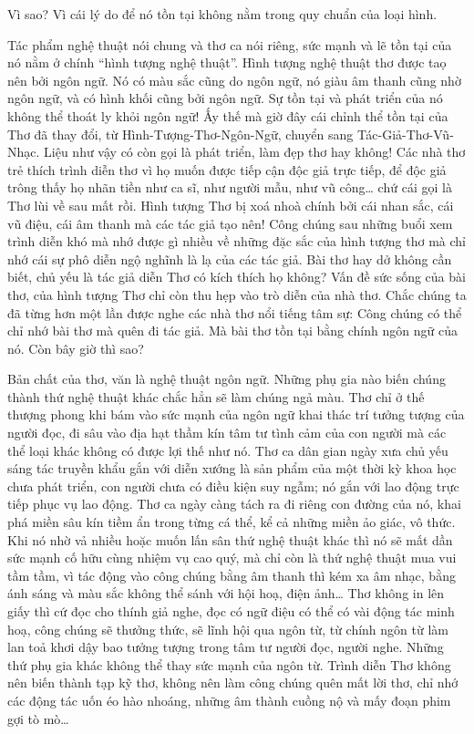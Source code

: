 \documentclass[../main.tex]{subfiles}
\begin{document}
\begin{multicols}{2}
Vì sao? Vì cái lý do để nó tồn tại không nằm trong quy chuẩn của loại hình. 
 
Tác phẩm nghệ thuật nói chung và thơ ca nói riêng, sức mạnh và lẽ tồn tại của nó nằm ở chính “hình tượng nghệ  thuật”. Hình tượng nghệ thuật thơ được taọ nên bởi ngôn ngữ. Nó có màu sắc cũng do ngôn ngữ, nó giàu âm thanh cũng nhờ ngôn ngữ, và có hình khối cũng bởi ngôn ngữ. Sự tồn tại và phát triển của nó không thể thoát ly khỏi ngôn ngữ! Ấy thế mà giờ đây cái chỉnh thể tồn tại của Thơ đã thay đổi, từ Hình-Tượng-Thơ-Ngôn-Ngữ, chuyển sang Tác-Giả-Thơ-Vũ-Nhạc. Liệu như vậy có còn gọi là phát triển, làm đẹp thơ hay không! Các nhà thơ trẻ thích trình diễn thơ vì họ muốn được tiếp cận độc giả trực tiếp, để độc giả trông thấy họ nhãn tiền như ca sĩ, như người mẫu, như vũ công… chứ cái gọi là Thơ lùi về sau mất rồi. Hình tượng Thơ bị xoá nhoà chính bởi cái nhan sắc, cái vũ điệu, cái âm thanh mà các tác giả tạo nên! Công chúng sau những buổi xem trình diễn khó mà nhớ được gì nhiều về những đặc sắc của hình tượng thơ mà chỉ nhớ cái sự phô diễn ngộ nghĩnh là lạ của các tác giả. Bài thơ hay dở không cần biết, chủ yếu là tác giả diễn Thơ có kích thích họ không? Vấn đề sức sống của bài thơ, của hình tượng Thơ chỉ còn thu hẹp vào trò diễn của nhà thơ. Chắc chúng ta đã từng hơn một lần được nghe các nhà thơ nổi tiếng tâm sự: Công chúng có thể chỉ nhớ bài thơ mà quên đi tác giả. Mà bài thơ tồn tại bằng chính ngôn ngữ của nó. Còn bây giờ thì sao? 
 
Bản chất của thơ, văn là nghệ thuật ngôn ngữ. Những phụ gia nào biến chúng thành thứ nghệ thuật khác chắc hẳn sẽ làm chúng ngả màu. Thơ chỉ ở thế thượng phong khi bám vào sức mạnh của ngôn ngữ khai thác trí tưởng tượng của người đọc, đi sâu vào địa hạt thầm kín tâm tư tình cảm của con người mà các thể loại khác không có được lợi thế như nó. Thơ ca dân gian ngày xưa chủ yếu sáng tác truyền khẩu gắn với diễn xướng là sản phẩm của một thời kỳ khoa học chưa phát triển, con người chưa có điều kiện suy ngẫm; nó gắn với lao động trực tiếp phục vụ lao động. Thơ ca ngày càng tách ra đi riêng con đường của nó, khai phá miền sâu kín tiềm ẩn trong từng cá thể, kể cả những miền ảo giác, vô thức. Khi nó nhờ vả nhiều hoặc muốn lấn sân thứ nghệ thuật khác thì nó sẽ mất dần sức mạnh cố hữu cùng nhiệm vụ cao quý, mà chỉ còn là thứ nghệ thuật mua vui tầm tầm, vì tác động vào công chúng bằng âm thanh thì kém xa âm nhạc, bằng ánh sáng và màu sắc không thể sánh với hội hoạ, điện ảnh… Thơ không in lên giấy thì cứ đọc cho thính giả nghe, đọc có ngữ điệu có thể có vài động tác minh hoạ, công chúng sẽ thưởng thức, sẽ lĩnh hội qua ngôn từ, từ chính ngôn từ làm lan toả khơi dậy bao tưởng tượng trong tâm tư người đọc, người nghe. Những thứ phụ gia khác không thể thay sức mạnh của ngôn từ. Trình diễn Thơ không nên biến thành tạp kỹ thơ, không nên làm công chúng quên mất lời thơ, chỉ nhớ các động tác uốn éo hào nhoáng, những âm thành cuồng nộ và mấy đoạn phim gợi tò mò… 
 

\end{multicols}
\end{document}
